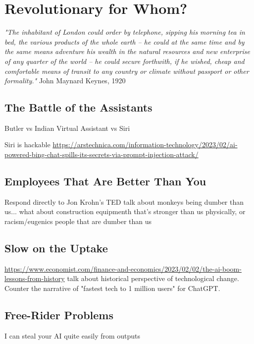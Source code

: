 \setchapterpreamble[u]{\margintoc}
\chapter{Revolutionary for Whom?}

\textit{"The inhabitant of London could order by telephone, sipping his morning tea in bed, the various products of the whole earth -- he could at the same time and by the same means adventure his wealth in the natural resources and new enterprise of any quarter of the world -- he could secure forthwith, if he wished, cheap and comfortable means of transit to any country or climate without passport or other formality."} John Maynard Keynes, 1920 \cite{Keynes2012}

\section{The Battle of the Assistants}

Butler vs Indian Virtual Assistant vs Siri

Siri is hackable \url{https://arstechnica.com/information-technology/2023/02/ai-powered-bing-chat-spills-its-secrets-via-prompt-injection-attack/}

\section{Employees That Are Better Than You}

Respond directly to Jon Krohn's TED talk about monkeys being dumber than us... what about construction equipmenth that's stronger than us physically, or racism/eugenics people that are dumber than us 

\section{Slow on the Uptake}

\url{https://www.economist.com/finance-and-economics/2023/02/02/the-ai-boom-lessons-from-history} talk about historical perspective of technological change. Counter the narrative of "fastest tech to 1 million users" for ChatGPT.

\section{Free-Rider Problems}

I can steal your AI quite easily from outputs

